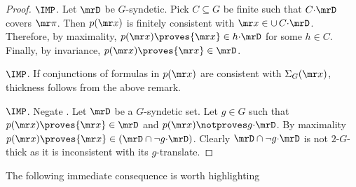 \begin{proof}
  $\IMP$.
  Let $\mrD$ be $G$-syndetic.
  Pick $C\subseteq G$ be finite such that $C{\cdot}\mrD$ covers ${\mr\pi}$.
  Then $p({\mr x})$ is finitely consistent with ${\mr x}\in\cup\,C{\cdot}\mrD$.
  Therefore, by maximality, $p({\mr x})\proves {\mr x}\in h{\cdot}\mrD$ for some $h\in C$.
  Finally, by invariance, $p({\mr x})\proves{\mr x}\in\mrD$.
  
  $\IMP$.
  If conjunctions of formulas in $p({\mr x})$ are consistent with $\Sigma_G({\mr x})$, thickness follows from the above remark.

  $\IMP$.
  Negate .
  Let $\mrD$ be a $G$-syndetic set.
  Let $g\in G$ such that $p({\mr x})\proves{\mr x}\in\mrD$ and $p({\mr x})\notproves g{\cdot}\mrD$.
  By maximality $p({\mr x})\proves{\mr x}\in(\mrD\cap\neg g{\cdot}\mrD)$.
  Clearly $\mrD\cap \neg g{\cdot}\mrD$ is not $2$-$G$-thick as it is inconsistent with its $g$-translate.
\end{proof}




 The following immediate consequence is worth highlighting

